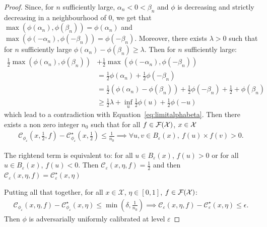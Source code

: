 \begin{proof}
    Since, for $n$ sufficiently large, $\alpha_n<0<\beta_n$ and $\phi$ is decreasing  and strictly decreasing in a neighbourhood of $0$, we get that $\max\left(\phi(\alpha_n),\phi(\beta_n)\right) = \phi(\alpha_n)$ and $\max\left(\phi(-\alpha_n),\phi(-\beta_n)\right) = \phi(-\beta_n)$. Moreover, there exists $\lambda>0$ such that for $n$ sufficiently large $\phi(\alpha_n) - \phi(\beta_n)\geq \lambda$. Then for $n$ sufficiently large:
    \begin{align*}
        \frac12\max\left(\phi(\alpha_n),\phi(\beta_n)\right)&+\frac12\max\left(\phi(-\alpha_n),\phi(-\beta_n)\right)\\
         &= \frac{1}{2} \phi(\alpha_n) +\frac12 \phi(-\beta_n)\\
        &= \frac{1}{2} \left(\phi(\alpha_n)- \phi(\beta_n)\right)+\frac12 \phi(-\beta_n)+\frac{1}{2}+ \phi(\beta_n)\\
        &\geq \frac12\lambda +\inf_u \frac12\phi(u)+\frac12\phi(-u)
    \end{align*}
    which lead to a contradiction with Equation~\ref{eq:limitalphabeta}. Then there exists a non zero integer $n_0$ such that for all $f\in\mathcal{F}(\mathcal{X})$, $x\in\mathcal{X}$
    \begin{align*}
        \mathcal{C}_{\phi_\varepsilon}(x,\frac12,f) - \mathcal{C}_{\phi_\varepsilon}^\star(x,\frac12)\leq \frac{1}{n_0} \implies \forall u,v\in B_\varepsilon(x),~ f(u)\times f(v)> 0.
    \end{align*}
    
    The rightend term is equivalent to: for all $u\in B_\varepsilon(x)$, $f(u)>0$ or for all $u\in B_\varepsilon(x)$, $f(u)<0$.  Then $\mathcal{C}_\varepsilon(x,\eta,f) =\frac12$ and then $\mathcal{C}_\varepsilon(x,\eta,f) = \mathcal{C}_\varepsilon^\star(x,\eta)$
    
    \medskip
    
    Putting all that together, for all $x\in\mathcal{X}$, $\eta\in [0,1]$, $f\in \mathcal{F}(\mathcal{X})$:
    \begin{align*}
        \mathcal{C}_{\phi_\varepsilon}(x,\eta,f) - \mathcal{C}_{\phi_\varepsilon}^\star(x,\eta)\leq \min(\delta,\frac{1}{n_0}) \implies \mathcal{C}_{\varepsilon}(x,\eta,f) - \mathcal{C}_{\varepsilon}^\star(x,\eta)\leq \epsilon.
    \end{align*}
    Then $\phi$ is adversarially uniformly calibrated at level $\varepsilon$
\end{proof}




